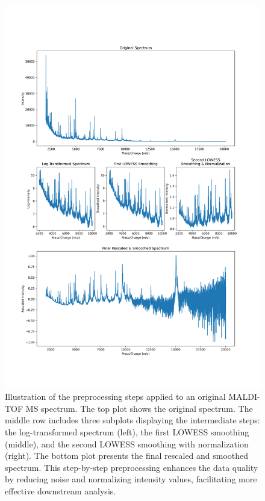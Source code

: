 \documentclass[english,11pt,a4paper,titlepage]{article}
\begin{document}
	\begin{figure}[h]
		\centering
		\includegraphics[width=0.9\linewidth]{img/preprocessing_steps_combined.png}
		\caption{Illustration of the preprocessing steps applied to an original MALDI-TOF MS spectrum. The top plot shows the original spectrum. The middle row includes three subplots displaying the intermediate steps: the log-transformed spectrum (left), the first LOWESS smoothing (middle), and the second LOWESS smoothing with normalization (right). The bottom plot presents the final rescaled and smoothed spectrum. This step-by-step preprocessing enhances the data quality by reducing noise and normalizing intensity values, facilitating more effective downstream analysis.}
		\label{fig:preprocessing_steps}
	\end{figure}
	\clearpage
	
\end{document}
